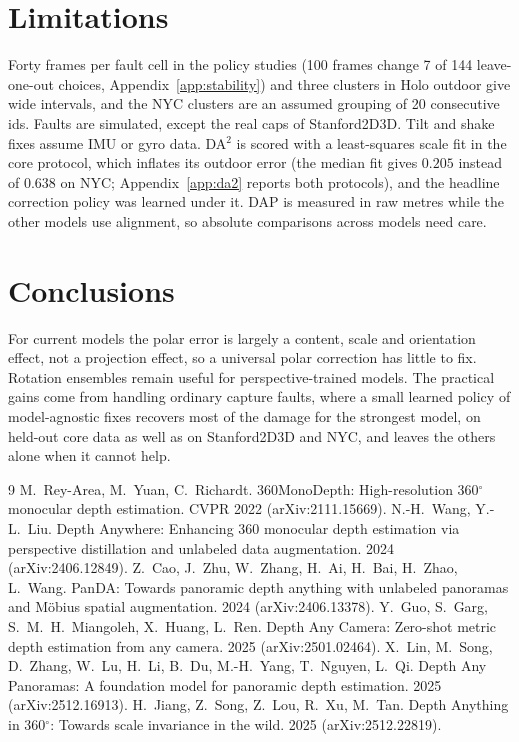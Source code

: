 \documentclass{article}
\begin{document}
\section{Limitations}
Forty frames per fault cell in the policy studies (100 frames change 7 of 144 leave-one-out choices, Appendix~\ref{app:stability}) and three clusters in Holo outdoor give wide intervals, and the NYC clusters are an assumed grouping of 20 consecutive ids. Faults are simulated, except the real caps of Stanford2D3D. Tilt and shake fixes assume IMU or gyro data. DA$^2$ is scored with a least-squares scale fit in the core protocol, which inflates its outdoor error (the median fit gives $0.205$ instead of $0.638$ on NYC; Appendix~\ref{app:da2} reports both protocols), and the headline correction policy was learned under it. DAP is measured in raw metres while the other models use alignment, so absolute comparisons across models need care.

\section{Conclusions}
For current models the polar error is largely a content, scale and orientation effect, not a projection effect, so a universal polar correction has little to fix. Rotation ensembles remain useful for perspective-trained models. The practical gains come from handling ordinary capture faults, where a small learned policy of model-agnostic fixes recovers most of the damage for the strongest model, on held-out core data as well as on Stanford2D3D and NYC, and leaves the others alone when it cannot help.

\begin{thebibliography}{9}
 M.~Rey-Area, M.~Yuan, C.~Richardt. 360MonoDepth: High-resolution 360$^\circ$ monocular depth estimation. CVPR 2022 (arXiv:2111.15669).
 N.-H.~Wang, Y.-L.~Liu. Depth Anywhere: Enhancing 360 monocular depth estimation via perspective distillation and unlabeled data augmentation. 2024 (arXiv:2406.12849).
 Z.~Cao, J.~Zhu, W.~Zhang, H.~Ai, H.~Bai, H.~Zhao, L.~Wang. PanDA: Towards panoramic depth anything with unlabeled panoramas and M\"obius spatial augmentation. 2024 (arXiv:2406.13378).
 Y.~Guo, S.~Garg, S.~M.~H.~Miangoleh, X.~Huang, L.~Ren. Depth Any Camera: Zero-shot metric depth estimation from any camera. 2025 (arXiv:2501.02464).
 X.~Lin, M.~Song, D.~Zhang, W.~Lu, H.~Li, B.~Du, M.-H.~Yang, T.~Nguyen, L.~Qi. Depth Any Panoramas: A foundation model for panoramic depth estimation. 2025 (arXiv:2512.16913).
 H.~Jiang, Z.~Song, Z.~Lou, R.~Xu, M.~Tan. Depth Anything in 360$^\circ$: Towards scale invariance in the wild. 2025 (arXiv:2512.22819).
\end{thebibliography}
\end{document}
